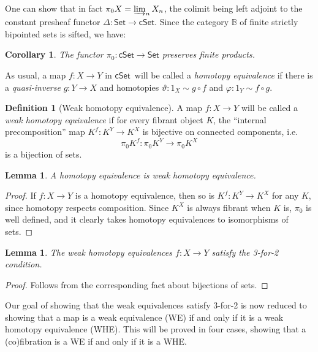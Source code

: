 \documentclass[11pt]{article}
\newcommand{\B}{\ensuremath{\mathbb{B}}}
\newcommand{\Set}{\ensuremath{\mathsf{Set}}}
\newcommand{\cSet}{\ensuremath{\mathsf{cSet}}}
\newcommand{\ra}{\ensuremath{\rightarrow}}
\newtheorem{lemma}[theorem]{Lemma}
\newtheorem{corollary}[theorem]{Corollary}
\theoremstyle{remark}
\theoremstyle{definition}
\newtheorem{definition}[theorem]{Definition}
\begin{document}
One can show that in fact $\pi_0X = \varinjlim_n X_n$, the colimit being left adjoint to the constant presheaf functor $\Delta : \Set\to\cSet$. Since the category $\B$ of finite strictly bipointed sets is sifted, we have:

\begin{corollary}
The functor $\pi_0: \cSet\to\Set$ preserves finite products. 
\end{corollary}

As usual, a map $f: X\ra Y$ in \cSet\ will be called a \emph{homotopy equivalence} if there is a \emph{quasi-inverse} $g: Y\ra X$ and homotopies $\vartheta : 1_X \sim g\circ f$ and $\varphi : 1_Y\sim f\circ g$.

\begin{definition}[Weak homotopy equivalence]
A map $f: X\ra Y$ will be called a \emph{weak homotopy equivalence} if for every fibrant object $K$, the ``internal precomposition'' map $K^f : K^Y \ra K^X$ is bijective on connected components, i.e.\  $$\pi_0K^f : \pi_0K^Y \to \pi_0K^X$$ is a bijection of sets.
\end{definition}

\begin{lemma}\label{lemma:HEisWHE}
A homotopy equivalence is weak homotopy equivalence.
\end{lemma}
\begin{proof}
If $f: X\ra Y$ is a homotopy equivalence, then so is $K^f : K^Y \to K^X$ for any $K$, since homotopy respects composition. Since $K^X$ is always fibrant when $K$ is, $\pi_0$ is well defined, and it clearly takes homotopy equivalences to isomorphisms of sets.
\end{proof}


\begin{lemma}
The weak homotopy equivalences $f : X\ra Y$ satisfy the 3-for-2 condition. 
\end{lemma}
\begin{proof}
Follows from the corresponding fact about bijections of sets.
\end{proof}

Our goal of showing that the weak equivalences satisfy 3-for-2 is now reduced to showing that a map is a weak equivalence (WE) if and only if it is a weak homotopy equivalence (WHE). This will be proved in four cases, showing that a (co)fibration is a WE if and only if it is a WHE. 
\end{document}
